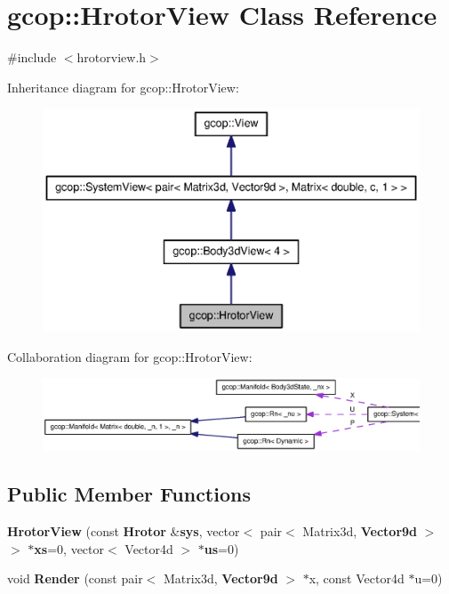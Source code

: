 \section{gcop\-:\-:\-Hrotor\-View \-Class \-Reference}
\label{classgcop_1_1HrotorView}


{\ttfamily \#include $<$hrotorview.\-h$>$}



\-Inheritance diagram for gcop\-:\-:\-Hrotor\-View\-:
\nopagebreak
\begin{figure}[H]
\begin{center}
\leavevmode
\includegraphics[width=350pt]{classgcop_1_1HrotorView__inherit__graph}
\end{center}
\end{figure}


\-Collaboration diagram for gcop\-:\-:\-Hrotor\-View\-:
\nopagebreak
\begin{figure}[H]
\begin{center}
\leavevmode
\includegraphics[width=350pt]{classgcop_1_1HrotorView__coll__graph}
\end{center}
\end{figure}
\subsection*{\-Public \-Member \-Functions}
\begin{DoxyCompactItemize}
\item 
{\bf \-Hrotor\-View} (const {\bf \-Hrotor} \&{\bf sys}, vector$<$ pair$<$ \-Matrix3d, {\bf \-Vector9d} $>$ $>$ $\ast${\bf xs}=0, vector$<$ \-Vector4d $>$ $\ast${\bf us}=0)
\item 
void {\bf \-Render} (const pair$<$ \-Matrix3d, {\bf \-Vector9d} $>$ $\ast$x, const \-Vector4d $\ast$u=0)
\end{DoxyCompactItemize}
